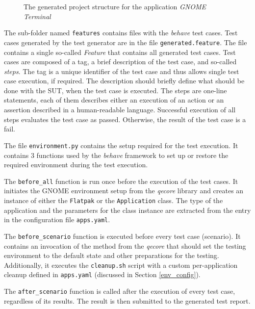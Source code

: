 \begin{figure}[H]
\caption{The generated project structure for the application \textit{GNOME Terminal}}
\label{project_folder}
\end{figure}

The sub-folder named \texttt{features} contains files with the \textit{behave} test cases. Test cases generated by the test generator are in the file \texttt{generated.feature}. The file contains a single so-called \textit{Feature} that contains all generated test cases. Test cases are composed of a tag, a brief description of the test case, and so-called \textit{steps}. The tag is a unique identifier of the test case and thus allows single test case execution, if required. The description should briefly define what should be done with the SUT, when the test case is executed. The steps are one-line statements, each of them describes either an execution of an action or an assertion described in a human-readable language. Successful execution of all steps evaluates the test case as passed. Otherwise, the result of the test case is a fail.

The file \texttt{environment.py} contains the setup required for the test execution. It contains 3 functions used by the \textit{behave} framework to set up or restore the required environment during the test execution. 

The \texttt{before\_all} function is run once before the execution of the test cases. It initiates the GNOME environment setup from the \textit{qecore} library and creates an instance of either the \texttt{Flatpak} or the \texttt{Application} class. The type of the application and the parameters for the class instance are extracted from the entry in the configuration file \texttt{apps.yaml}. 

The \texttt{before\_scenario} function is executed before every test case (scenario). It contains an invocation of the method from the \textit{qecore} that should set the testing environment to the default state and other preparations for the testing. Additionally, it executes the \texttt{cleanup.sh} script with a custom per-application cleanup defined in \texttt{apps.yaml} (discussed in Section \ref{env_config}). 

The \texttt{after\_scenario} function is called after the execution of every test case, regardless of its results. The result is then submitted to the generated test report.

